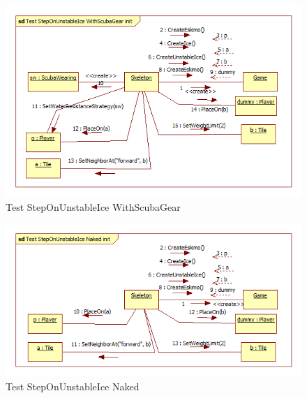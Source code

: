 \begin{figure}[h]
	\begin{center}
		\includegraphics[width=17cm]{chapters/chapter05/diagrams/Test_StepOnUnstableIce_WithScubaGear_init.png}
		\caption{Test StepOnUnstableIce WithScubaGear}
		\label{fig:Test StepOnUnstableIce WithScubaGear}
	\end{center}
\end{figure}

\begin{figure}[h]
	\begin{center}
		\includegraphics[width=17cm]{chapters/chapter05/diagrams/Test_StepOnUnstableIce_Naked_init.png}
		\caption{Test StepOnUnstableIce Naked}
		\label{fig:Test StepOnUnstableIce Naked}
	\end{center}
\end{figure}

